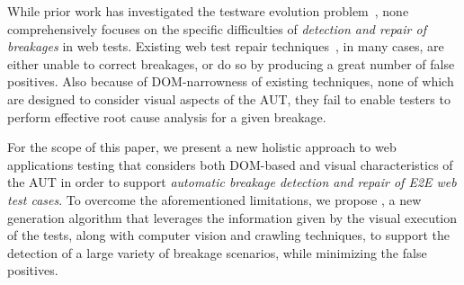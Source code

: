 
While prior work has investigated the testware evolution problem~\cite{2016-leotta-Advances,2014-leotta-WoSAR,2015-leotta-ICST,Thummalapenta:2013:ECT:2486788.2486926,Yandrapally:2014:RTA:2610384.2610390,Choudhary:2011:WWA:2002931.2002935,Hammoudi-2016-FSE}, 
none comprehensively focuses on the specific difficulties of \textit{detection and repair of breakages} in web tests. 
Existing web test repair techniques~\cite{Choudhary:2011:WWA:2002931.2002935,Hammoudi-2016-FSE,2015-leotta-ICST}, in many cases, are either unable to correct breakages, or do so by producing a great number of false positives. 
%
Also because of DOM-narrowness of existing techniques, none of which are designed to consider visual aspects of the AUT, they fail to enable testers to perform effective root cause analysis for a given breakage. 


For the scope of this paper, we present a new holistic approach to  web applications testing that considers both DOM-based and visual characteristics of the AUT in order to support \textit{automatic breakage detection and repair of E2E web test cases}. 
To overcome the aforementioned limitations, we propose \tool, a new generation algorithm that leverages the information given by the visual execution of the tests, along with computer vision and crawling techniques, to support the detection of a large variety of breakage scenarios, while minimizing the false positives. 

